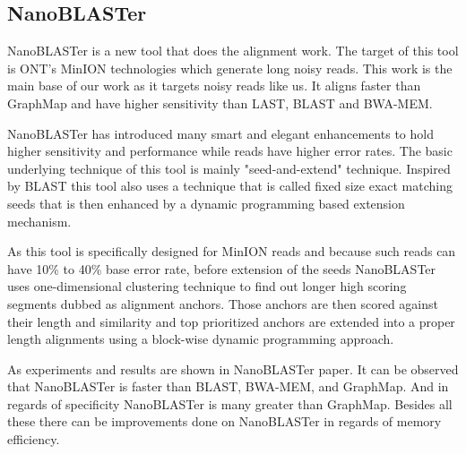 \documentclass{standalone}
\begin{document}
\subsection{NanoBLASTer}
NanoBLASTer\cite{nanoBLAST} is a new tool that does the alignment work. The target of this tool is ONT's MinION technologies which generate long noisy reads.  This work is the main base of our work as it targets noisy reads like us. It aligns faster than GraphMap\cite{GraphMap} and have higher sensitivity than LAST\cite{LAST}, BLAST\cite{BLAST} and BWA-MEM\cite{BWA_MEM}.
\par 
NanoBLASTer has introduced many smart and elegant enhancements to hold higher sensitivity and performance while reads have higher error rates. The basic underlying technique of this tool is mainly "seed-and-extend" technique. Inspired by BLAST\cite{BLAST} this tool also uses a technique that is called fixed size exact matching seeds that is then enhanced by a dynamic programming based extension mechanism.
\par 
As this tool is specifically designed for MinION\cite{minion} reads and because such reads can have 10\% to 40\% base error rate\cite{minionError1,minionError2}, before extension of the seeds NanoBLASTer uses one-dimensional clustering technique to find out longer high scoring segments dubbed as alignment anchors. Those anchors are then scored against their length and similarity and top prioritized anchors are extended into a proper length alignments using a block-wise dynamic programming approach.
\par 
As experiments and results are shown in NanoBLASTer\cite{nanoBLAST} paper. It can be observed that NanoBLASTer is faster than BLAST, BWA-MEM, and GraphMap. And in regards of specificity NanoBLASTer is many greater than GraphMap. Besides all these there can be improvements done on NanoBLASTer in regards of memory efficiency. 
 
\end{document}
